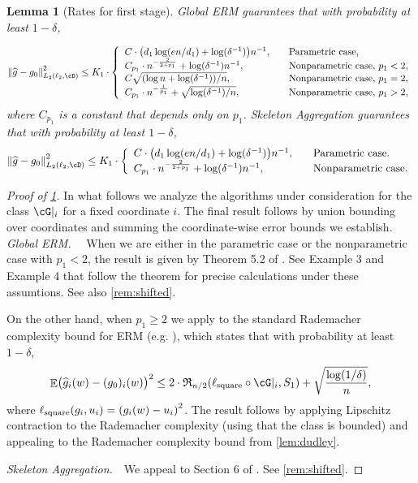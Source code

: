 \documentclass[11pt]{article} %
\newcommand{\pref}[1]{\cref{#1}}
\newcommand{\pfref}[1]{Proof of \pref{#1}}
\theoremstyle{theorem}  %
\newtheorem{lemma}{Lemma}
\theoremstyle{plain}
\DeclarePairedDelimiter{\prn}{(}{)}
\DeclarePairedDelimiter{\nrm}{\|}{\|}
\DeclareMathOperator{\En}{\mathbb{E}}
\newcommand{\ls}{\ell}
\newcommand{\wh}[1]{\widehat{#1}}
\newcommand{\estone}{\wh{g}}
\newcommand{\pone}{p_1}
\newcommand{\done}{d_1}
\newcommand{\nuisance}{\cG}
\newcommand{\dimone}{K_1}
\newcommand{\gtone}{g_0}
\newcommand{\sampleone}{S_1}
\begin{document}
\begin{lemma}[Rates for first stage]
\label{lem:stageone_rates}
%
%
Global ERM guarantees that with probability at least $1-\delta$,

\begin{align*}
\nrm*{\estone-\gtone}_{L_{2}(\ls_2,\cD)}^{2} \leq \dimone\cdot\left\{
\begin{array}{ll}
C\cdot{}\prn*{\done\log(en/\done) + \log(\delta^{-1})}n^{-1},\quad&\text{Parametric case,}\\
C_{\pone}\cdot{}n^{-\frac{2}{2+\pone}} + \log(\delta^{-1})n^{-1},\quad&\text{Nonparametric case, $\pone<2$,}\\
C\sqrt{(\log{}n + \log(\delta^{-1}))/n},\quad&\text{Nonparametric case, $\pone=2$,}\\
C_{\pone}\cdot{}n^{-\frac{1}{\pone}} + \sqrt{\log(\delta^{-1})/n},\quad&\text{Nonparametric case, $\pone>2$,}
%
\end{array}
\right.
\end{align*}
where $C_{\pone}$ is a constant that depends only on $\pone$. Skeleton Aggregation guarantees that with probability at least $1-\delta$,
\begin{align*}
\nrm*{\estone-\gtone}_{L_{2}(\ls_2,\cD)}^{2} \leq \dimone\cdot\left\{
\begin{array}{ll}
C\cdot{}\prn*{\done\log(en/\done) + \log(\delta^{-1})}n^{-1},\quad&\text{Parametric case.}\\
C_{\pone}\cdot{}n^{-\frac{2}{2+\pone}} + \log(\delta^{-1})n^{-1},\quad&\text{Nonparametric case.}
\end{array}
\right.
\end{align*}
\end{lemma}
\begin{proof}[\pfref{lem:stageone_rates}] 
In what follows we analyze the algorithms under consideration for the class $\nuisance|_i$ for a fixed coordinate $i$. The final result follows by union bounding over coordinates and summing the coordinate-wise error bounds we establish.\\
\noindent\emph{Global ERM.}~~ When we are either in the parametric case or the nonparametric case with $\pone<2$, the result is given by Theorem 5.2 of \cite{koltchinskii2011introduction}. See Example 3 and Example 4 that follow the theorem for precise calculations under these assumtions. See also \pref{rem:shifted}.

On the other hand, when $\pone\geq{}2$ we apply to the standard Rademacher complexity bound for ERM (e.g. \cite{shalev2014understanding}), which states that with probability at least $1-\delta$,
\[
\En\prn[\big]{\estone_i(w)-(g_0)_i(w)}^{2} \leq{} 2\cdot\mathfrak{R}_{n/2}(\ell_{\mathrm{square}}\circ\nuisance|_i,\sampleone) + \sqrt{\frac{\log(1/\delta)}{n}},
\]
where $\ell_{\mathrm{square}}(g_i, u_i) = \prn*{g_i(w) - u_i}^{2}$. The result follows by applying Lipschitz contraction to the Rademacher complexity (using that the class is bounded) and appealing to the Rademacher complexity bound from \pref{lem:dudley}.

\noindent\emph{Skeleton Aggregation.}~~We appeal to Section 6 of \cite{rakhlin2017empirical}. See \pref{rem:shifted}.

\end{proof}
\end{document}
